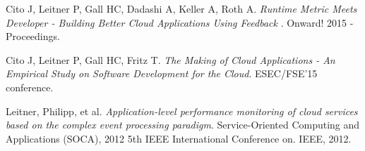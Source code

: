 \documentclass[article,type=msc,colorback,accentcolor=tud7b]{tudthesis}
\begin{document}
\begin{thebibliography}{1}
\bibitem{}
	Cito J, Leitner P, Gall HC, Dadashi A, Keller A, Roth A.
	\emph { Runtime Metric Meets Developer - Building Better Cloud Applications Using Feedback }. 
	Onward! 2015 - Proceedings.
	
	Cito J, Leitner P, Gall HC, Fritz T.
	\emph { The Making of Cloud Applications - An Empirical Study on
Software Development for the Cloud}. 
	ESEC/FSE'15 conference.
	
	Leitner, Philipp, et al. 
	\emph { Application-level performance monitoring of cloud services based on the complex event processing paradigm}. 
	Service-Oriented Computing and Applications (SOCA), 2012 5th IEEE International Conference on. IEEE, 2012.
	
 	
	
	
\end{thebibliography}	  
\end{document}
